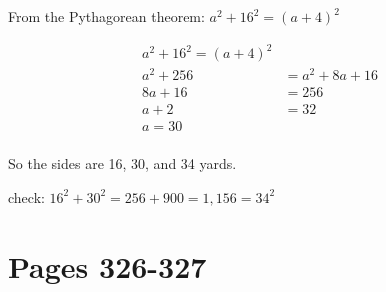 \documentclass[fleqn,addpoints]{exam}
\begin{document}
\begin{description}
From the Pythagorean theorem: $a^2 + 16^2 = (a+4)^2$

\begin{align*}
  a^2 + 16^2 = (a+4)^2 \\
  a^2 + 256 &= a^2 + 8a + 16 \\
  8a + 16 &= 256 \\
  a + 2 &= 32 \\
  a = 30 \\
\end{align*}

So the sides are 16, 30, and 34 yards.

check: $16^2 + 30^2 = 256 + 900 = 1,156 = 34^2$

\end{description}

\section{Pages 326-327}
\end{document}
